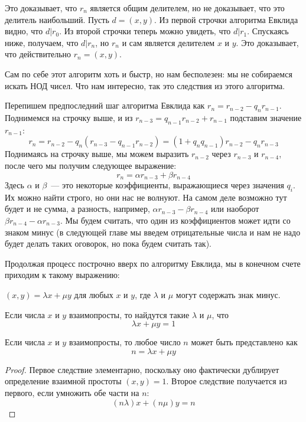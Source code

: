 Это доказывает, что $r_n$ является общим делителем, но не доказывает, что это делитель наибольший. Пусть $d = (x, y)$. Из первой строчки алгоритма Евклида видно, что $d|r_0$. Из второй строчки теперь можно увидеть, что $d|r_1$. Спускаясь ниже, получаем, что $d|r_n$, но $r_n$ и сам является делителем $x$ и $y$. Это доказывает, что действительно $r_n = (x, y)$.

Сам по себе этот алгоритм хоть и быстр, но нам бесполезен: мы не собираемся искать НОД чисел. Что нам интересно, так это следствия из этого алгоритма.

Перепишем предпоследний шаг алгоритма Евклида как $r_n = r_{n-2} - q_n r_{n-1}$. Поднимемся на строчку выше, и из $r_{n-3} = q_{n-1} r_{n-2} + r_{n-1}$ подставим значение $r_{n-1}$:
$$r_n = r_{n-2} - q_n(r_{n-3} - q_{n-1}r_{n-2}) = (1+q_n q_{n-1})r_{n-2} - q_n r_{n-3}$$
Поднимаясь на строчку выше, мы можем выразить $r_{n-2}$ через $r_{n-3}$ и $r_{n-4}$, после чего мы получим следующее выражение:
$$r_n = \alpha r_{n-3} + \beta r_{n-4}$$
Здесь $\alpha$ и $\beta$~— это некоторые коэффициенты, выражающиеся через значения $q_i$. Их можно найти строго, но они нас не волнуют. На самом деле возможно тут будет и не сумма, а разность, например, $\alpha r_{n-3} - \beta r_{n-4}$ или наоборот $\beta r_{n-4} - \alpha r_{n-3}$. Мы будем считать, что один из коэффициентов может идти со знаком минус (в следующей главе мы введем отрицательные числа и нам не надо будет делать таких оговорок, но пока будем считать так).

Продолжая процесс построчно вверх по алгоритму Евклида, мы в конечном счете приходим к такому выражению:

\begin{Bezus}
$(x, y) = \lambda x + \mu y$ для любых $x$ и $y$, где $\lambda$ и $\mu$ могут содержать знак минус.
\end{Bezus}
\begin{corollary}
Если числа $x$ и $y$ взаимопросты, то найдутся такие $\lambda$ и $\mu$, что
$$\lambda x + \mu y = 1$$
\end{corollary}
\begin{corollary}
Если числа $x$ и $y$ взаимопросты, то любое число $n$ может быть представлено как
$$n = \lambda x + \mu y$$
\end{corollary}
\begin{proof}
Первое следствие элементарно, поскольку оно фактически дублирует определение взаимной простоты $(x, y) = 1$. Второе следствие получается из первого, если умножить обе части на $n$:
$$(n\lambda) x + (n\mu) y = n$$
\end{proof}

